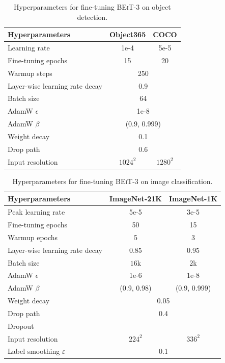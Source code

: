 \documentclass{article}
\newcommand{\xmark}{{\color{black}\ding{55}}}%
\newcommand\our{\textsc{BEiT-3}}
\begin{document}
\begin{table}[H]
\centering
\small
\begin{tabular}{l|cc}
\toprule
\bf Hyperparameters & \bf  Object365 & \bf COCO \\
\midrule
Learning rate & 1e-4 & 5e-5 \\
Fine-tuning epochs & 15 & 20 \\
Warmup steps & \multicolumn{2}{c}{250} \\
Layer-wise learning rate decay & \multicolumn{2}{c}{0.9} \\
Batch size & \multicolumn{2}{c}{64} \\
AdamW $\epsilon$ & \multicolumn{2}{c}{1e-8}  \\
AdamW $\beta$ & \multicolumn{2}{c}{(0.9, 0.999)} \\
Weight decay & \multicolumn{2}{c}{0.1} \\
Drop path & \multicolumn{2}{c}{0.6} \\
Input resolution & $1024^2$ & $1280^2$ \\
\bottomrule
\end{tabular}
\vspace{2mm}
\caption{
Hyperparameters for fine-tuning \our{} on object detection.
}
\label{tbl:ft:od:hyperparams}
\end{table}


\begin{table}[H]
\centering
\small
\begin{tabular}{l|cc}
\toprule
\bf Hyperparameters & \bf ImageNet-21K & \bf ImageNet-1K \\
\midrule
Peak learning rate & 5e-5 & 3e-5 \\
Fine-tuning epochs & 50 & 15 \\
Warmup epochs & 5 & 3 \\
Layer-wise learning rate decay & 0.85 & 0.95 \\
Batch size & $16$k & $2$k \\
AdamW $\epsilon$ & 1e-6 & 1e-8  \\
AdamW $\beta$ & (0.9, 0.98) & (0.9, 0.999) \\
Weight decay & \multicolumn{2}{c}{0.05} \\
Drop path & \multicolumn{2}{c}{0.4} \\
Dropout & \multicolumn{2}{c}{\xmark} \\
Input resolution & $224^2$ & $336^2$ \\
Label smoothing $\varepsilon$ & \multicolumn{2}{c}{0.1} \\
\bottomrule
\end{tabular}
\vspace{2mm}
\caption{
Hyperparameters for fine-tuning \our{} on image classification.
}
\label{tbl:ft:imagenet:hyperparams}
\end{table}
\end{document}

